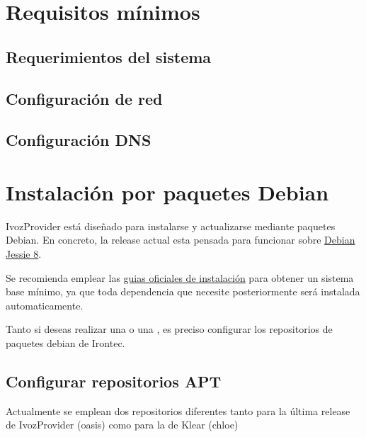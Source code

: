 \documentclass[letterpaper,10pt,spanish]{sphinxmanual}
\begin{document}
\section{Requisitos mínimos}
\label{installation/requirements:requisitos-minimos}\label{installation/requirements::doc}

\subsection{Requerimientos del sistema}
\label{installation/requirements:requerimientos-del-sistema}

\subsection{Configuración de red}
\label{installation/requirements:configuracion-de-red}

\subsection{Configuración DNS}
\label{installation/requirements:configuracion-dns}

\section{Instalación por paquetes Debian}
\label{installation/debian_install::doc}\label{installation/debian_install:instalacion-por-paquetes-debian}
IvozProvider está diseñado para instalarse y actualizarse mediante paquetes Debian. En concreto, la release actual esta pensada para funcionar sobre \href{https://www.debian.org/releases/jessie}{Debian Jessie 8}.

Se recomienda emplear las \href{https://www.debian.org/releases/jessie/installmanual}{guias oficiales de instalación} para obtener un sistema base mínimo, ya que toda dependencia que necesite posteriormente será instalada automaticamente.

Tanto si deseas realizar una {\hyperref[installation/install_types:instalacion\string-standalone]{}} o una {\hyperref[installation/install_types:instalacion\string-distribuida]{}}, es preciso configurar los repositorios de paquetes debian de Irontec.


\subsection{Configurar repositorios APT}
\label{installation/debian_install:configurar-repositorios-apt}
Actualmente se emplean dos repositorios diferentes tanto para la última release de IvozProvider (oasis) como para la de Klear (chloe)
\end{document}
